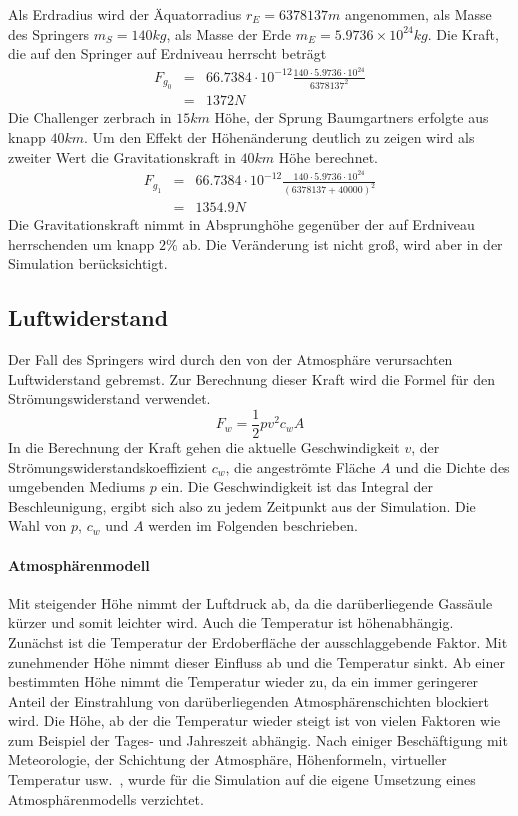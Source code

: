 Als Erdradius wird der Äquatorradius $r_E=6 378 137m$ angenommen, als Masse des Springers $m_S=140kg$, als Masse der Erde $m_E=5.9736\times 10^{24}kg$.
Die Kraft, die auf den Springer auf Erdniveau herrscht beträgt
\begin{eqnarray}
F_{g_0} &=& 66.7384\cdot 10^{-12} \frac{140\cdot 5.9736\cdot 10^{24}}{6 378 137^2} \\
 &=& 1372 N \nonumber
\end{eqnarray}
Die Challenger zerbrach in $15km$ Höhe, der Sprung Baumgartners erfolgte aus knapp $40km$.
Um den Effekt der Höhenänderung deutlich zu zeigen wird als zweiter Wert die Gravitationskraft in $40km$ Höhe berechnet.
\begin{eqnarray}
F_{g_1} &=& 66.7384\cdot 10^{-12} \frac{140\cdot 5.9736\cdot 10^{24}}{\left(6 378 137 + 40 000\right)^2} \\
 &=& 1354.9 N \nonumber
\end{eqnarray}
Die Gravitationskraft nimmt in Absprunghöhe gegenüber der auf Erdniveau herrschenden um knapp $2\%$ ab.
Die Veränderung ist nicht groß, wird aber in der Simulation berücksichtigt.

\subsection{Luftwiderstand}
Der Fall des Springers wird durch den von der Atmosphäre verursachten Luftwiderstand gebremst.
Zur Berechnung dieser Kraft wird die Formel für den Strömungswiderstand verwendet.
\begin{equation}
F_w=\frac{1}{2}pv^2c_wA
\end{equation}
In die Berechnung der Kraft gehen die aktuelle Geschwindigkeit $v$, der Strömungswiderstandskoeffizient $c_w$, die angeströmte Fläche $A$ und die Dichte des umgebenden Mediums $p$ ein.
Die Geschwindigkeit ist das Integral der Beschleunigung, ergibt sich also zu jedem Zeitpunkt aus der Simulation.
Die Wahl von $p$, $c_w$ und $A$ werden im Folgenden beschrieben.

\paragraph{Atmosphärenmodell}
Mit steigender Höhe nimmt der Luftdruck ab, da die darüberliegende Gassäule kürzer und somit leichter wird.
Auch die Temperatur ist höhenabhängig.
Zunächst ist die Temperatur der Erdoberfläche der ausschlaggebende Faktor.
Mit zunehmender Höhe nimmt dieser Einfluss ab und die Temperatur sinkt.
Ab einer bestimmten Höhe nimmt die Temperatur wieder zu, da ein immer geringerer Anteil der Einstrahlung von darüberliegenden Atmosphärenschichten blockiert wird.
Die Höhe, ab der die Temperatur wieder steigt ist von vielen Faktoren wie zum Beispiel der Tages- und Jahreszeit abhängig.
Nach einiger Beschäftigung mit Meteorologie, der Schichtung der Atmosphäre, Höhenformeln, virtueller Temperatur usw.~\cite{met:einfuehrung, met:umwelt}, wurde für die Simulation auf die eigene Umsetzung eines Atmosphärenmodells verzichtet.

